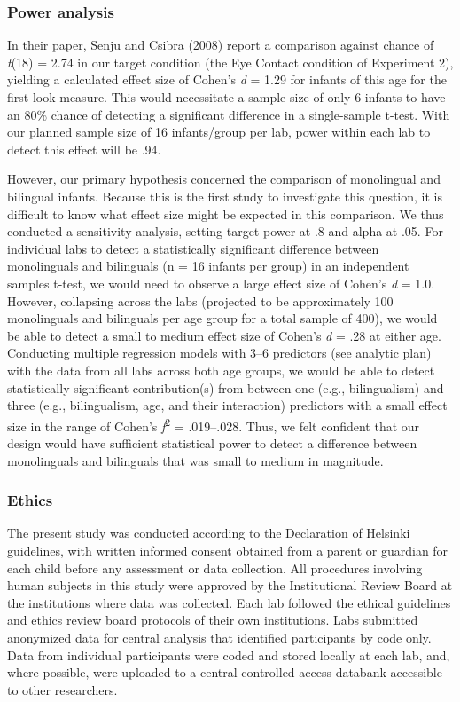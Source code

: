\documentclass[
  english,
  ,man,floatsintext]{apa6}
\begin{document}
\hypertarget{power-analysis}{%
\subsubsection{Power analysis}\label{power-analysis}}

In their paper, Senju and Csibra (2008) report a comparison against chance of \emph{t}(18) = 2.74 in our target condition (the Eye Contact condition of Experiment 2), yielding a calculated effect size of Cohen's \emph{d} = 1.29 for infants of this age for the first look measure. This would necessitate a sample size of only 6 infants to have an 80\% chance of detecting a significant difference in a single-sample t-test. With our planned sample size of 16 infants/group per lab, power within each lab to detect this effect will be .94.

However, our primary hypothesis concerned the comparison of monolingual and bilingual infants. Because this is the first study to investigate this question, it is difficult to know what effect size might be expected in this comparison. We thus conducted a sensitivity analysis, setting target power at .8 and alpha at .05. For individual labs to detect a statistically significant difference between monolinguals and bilinguals (n = 16 infants per group) in an independent samples t-test, we would need to observe a large effect size of Cohen's \emph{d} = 1.0. However, collapsing across the labs (projected to be approximately 100 monolinguals and bilinguals per age group for a total sample of 400), we would be able to detect a small to medium effect size of Cohen's \emph{d} = .28 at either age. Conducting multiple regression models with 3--6 predictors (see analytic plan) with the data from all labs across both age groups, we would be able to detect statistically significant contribution(s) from between one (e.g., bilingualism) and three (e.g., bilingualism, age, and their interaction) predictors with a small effect size in the range of Cohen's \emph{ƒ}\textsuperscript{2} = .019--.028. Thus, we felt confident that our design would have sufficient statistical power to detect a difference between monolinguals and bilinguals that was small to medium in magnitude.

\hypertarget{ethics}{%
\subsubsection{Ethics}\label{ethics}}

The present study was conducted according to the Declaration of Helsinki guidelines, with written informed consent obtained from a parent or guardian for each child before any assessment or data collection. All procedures involving human subjects in this study were approved by the Institutional Review Board at the institutions where data was collected. Each lab followed the ethical guidelines and ethics review board protocols of their own institutions. Labs submitted anonymized data for central analysis that identified participants by code only. Data from individual participants were coded and stored locally at each lab, and, where possible, were uploaded to a central controlled-access databank accessible to other researchers.
\end{document}
